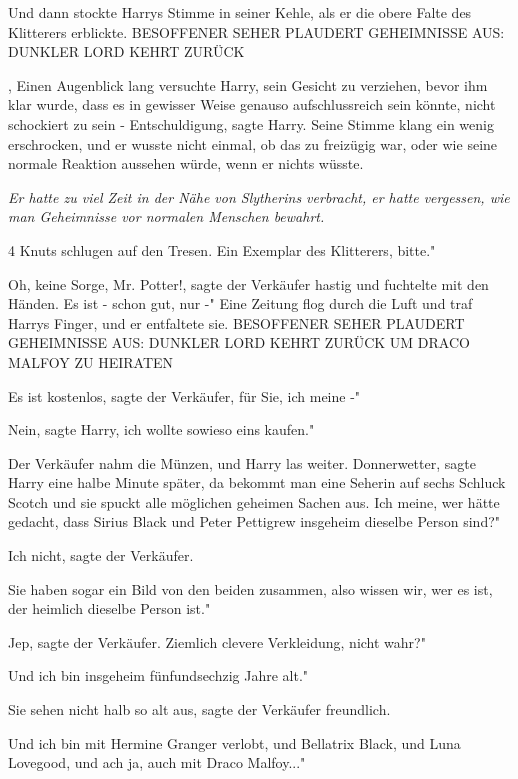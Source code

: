 Und dann stockte Harrys Stimme in seiner Kehle, als er die obere Falte des
Klitterers erblickte. BESOFFENER SEHER PLAUDERT GEHEIMNISSE AUS: DUNKLER LORD
KEHRT ZURÜCK

, Einen Augenblick lang versuchte Harry, sein Gesicht zu verziehen, bevor ihm
klar wurde, dass es in gewisser Weise genauso aufschlussreich sein könnte, nicht
schockiert zu sein - \glqq{}Entschuldigung\grqq{}, sagte Harry. Seine Stimme
klang ein wenig erschrocken, und er wusste nicht einmal, ob das zu freizügig
war, oder wie seine normale Reaktion aussehen würde, wenn er nichts wüsste.

\emph{Er hatte zu viel Zeit in der Nähe von Slytherins verbracht, er hatte
vergessen, wie man Geheimnisse vor normalen Menschen bewahrt.}

4 Knuts schlugen auf den Tresen. \glqq{}Ein Exemplar des Klitterers, bitte."

\glqq{}Oh, keine Sorge, Mr. Potter!\grqq{}, sagte der Verkäufer hastig und
fuchtelte mit den Händen. \glqq{}Es ist - schon gut, nur -" Eine Zeitung flog
durch die Luft und traf Harrys Finger, und er entfaltete sie. BESOFFENER SEHER
PLAUDERT GEHEIMNISSE AUS: DUNKLER LORD KEHRT ZURÜCK UM DRACO MALFOY ZU HEIRATEN

\glqq{}Es ist kostenlos\grqq{}, sagte der Verkäufer, \glqq{}für Sie, ich meine
-"

\glqq{}Nein\grqq{}, sagte Harry, \glqq{}ich wollte sowieso eins kaufen."

Der Verkäufer nahm die Münzen, und Harry las weiter. \glqq{}Donnerwetter\grqq{},
sagte Harry eine halbe Minute später, \glqq{}da bekommt man eine Seherin auf
sechs Schluck Scotch und sie spuckt alle möglichen geheimen Sachen aus. Ich
meine, wer hätte gedacht, dass Sirius Black und Peter Pettigrew insgeheim
dieselbe Person sind?"

\glqq{}Ich nicht\grqq{}, sagte der Verkäufer.

\glqq{}Sie haben sogar ein Bild von den beiden zusammen, also wissen wir, wer es
ist, der heimlich dieselbe Person ist."

\glqq{}Jep\grqq{}, sagte der Verkäufer. \glqq{}Ziemlich clevere Verkleidung,
nicht wahr?"

\glqq{}Und ich bin insgeheim fünfundsechzig Jahre alt."

\glqq{}Sie sehen nicht halb so alt aus\grqq{}, sagte der Verkäufer freundlich.

\glqq{}Und ich bin mit Hermine Granger verlobt, und Bellatrix Black, und Luna
Lovegood, und ach ja, auch mit Draco Malfoy..."

